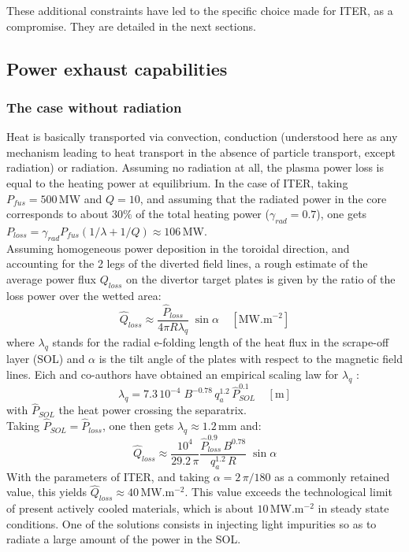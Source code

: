 These additional constraints have led to the specific choice made for ITER, as a compromise. They are detailed in the next sections.


\subsection{Power exhaust capabilities}
\label{sec:power_exhaust}

\subsubsection*{The case without radiation}

Heat is basically transported via convection, conduction (understood here as any mechanism leading to heat transport in the absence of particle transport, except radiation) or radiation. 
Assuming no radiation at all, the plasma power loss is equal to the heating power at equilibrium. In the case of ITER, taking $P_{fus}=500\,$MW and $Q=10$, and assuming that the radiated power in the core corresponds to about $30\%$ of the total heating power ($\gamma_{rad}=0.7$), one gets $P_{loss} = \gamma_{rad} P_{fus}(1/\lambda + 1/Q) \approx 106\,$MW. \\

Assuming homogeneous power deposition in the toroidal direction, and accounting for the 2 legs of the diverted field lines, a rough estimate of the average power flux $Q_{loss}$ on the divertor target plates is given by the ratio of the loss power over the wetted area:
\begin{equation}
	\hat Q_{loss} \approx \frac{\hat P_{loss}}{4\pi R \lambda_q} \;\sin\alpha \;\;\;\; [\textrm{MW.m}^{-2}]
\end{equation}
where $\lambda_q$ stands for the radial e-folding length of the heat flux in the scrape-off layer (SOL) and $\alpha$ is the tilt angle of the plates with respect to the magnetic field lines.
Eich and co-authors have obtained an empirical scaling law for $\lambda_q$ :
\begin{equation}
	\lambda_q = 7.3\,10^{-4}\; B^{-0.78} \, q_{a}^{1.2} \, \hat P_{SOL}^{0.1}\;\;\;\; [\textrm{m}]
\end{equation}
with $\hat P_{SOL}$ the heat power crossing the separatrix.\\

Taking $\hat P_{SOL} = \hat P_{loss}$, one then gets $\lambda_q \approx 1.2\,$mm and:
\begin{equation*}
	\hat Q_{loss} \approx \frac{10^4}{29.2\, \pi} 
	\frac{\hat P_{loss}^{0.9} \, B^{0.78}}{q_a^{1.2} \, R} \;\sin\alpha
\end{equation*}
With the parameters of ITER, and taking $\alpha = 2\, \pi/180$ as a commonly retained value, this yields $\hat Q_{loss} \approx 40\,$MW.m$^{-2}$. This value exceeds the technological limit of present actively cooled materials, which is about $10\,$MW.m$^{-2}$ in steady state conditions. One of the solutions consists in injecting light impurities so as to radiate a large amount of the power in the SOL.



